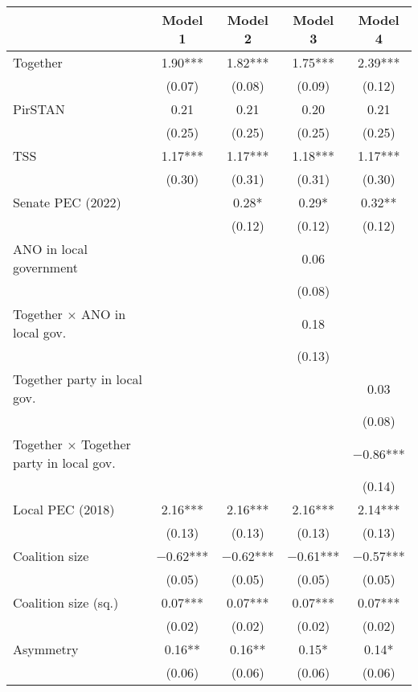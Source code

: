 \begin{table}
\centering
\begin{tabular}[t]{lcccc}
\toprule
  & Model 1 & Model 2 & Model 3 & Model 4\\
\midrule
Together & \num{1.90}*** & \num{1.82}*** & \num{1.75}*** & \num{2.39}***\\
 & (\num{0.07}) & (\num{0.08}) & (\num{0.09}) & (\num{0.12})\\
PirSTAN & \num{0.21} & \num{0.21} & \num{0.20} & \num{0.21}\\
 & (\num{0.25}) & (\num{0.25}) & (\num{0.25}) & (\num{0.25})\\
TSS & \num{1.17}*** & \num{1.17}*** & \num{1.18}*** & \num{1.17}***\\
 & (\num{0.30}) & (\num{0.31}) & (\num{0.31}) & (\num{0.30})\\
Senate PEC (2022) &  & \num{0.28}* & \num{0.29}* & \num{0.32}**\\
 &  & (\num{0.12}) & (\num{0.12}) & (\num{0.12})\\
ANO in local government &  &  & \num{0.06} & \\
 &  &  & (\num{0.08}) & \\
Together × ANO in local gov. &  &  & \num{0.18} & \\
 &  &  & (\num{0.13}) & \\
Together party in local gov. &  &  &  & \num{0.03}\\
 &  &  &  & (\num{0.08})\\
Together × Together party in local gov. &  &  &  & \num{-0.86}***\\
 &  &  &  & (\num{0.14})\\
Local PEC (2018) & \num{2.16}*** & \num{2.16}*** & \num{2.16}*** & \num{2.14}***\\
 & (\num{0.13}) & (\num{0.13}) & (\num{0.13}) & (\num{0.13})\\
Coalition size & \num{-0.62}*** & \num{-0.62}*** & \num{-0.61}*** & \num{-0.57}***\\
 & (\num{0.05}) & (\num{0.05}) & (\num{0.05}) & (\num{0.05})\\
Coalition size (sq.) & \num{0.07}*** & \num{0.07}*** & \num{0.07}*** & \num{0.07}***\\
 & (\num{0.02}) & (\num{0.02}) & (\num{0.02}) & \vphantom{1} (\num{0.02})\\
Asymmetry & \num{0.16}** & \num{0.16}** & \num{0.15}* & \num{0.14}*\\
 & (\num{0.06}) & (\num{0.06}) & (\num{0.06}) & (\num{0.06})\\

\end{tabular}
\end{table}

